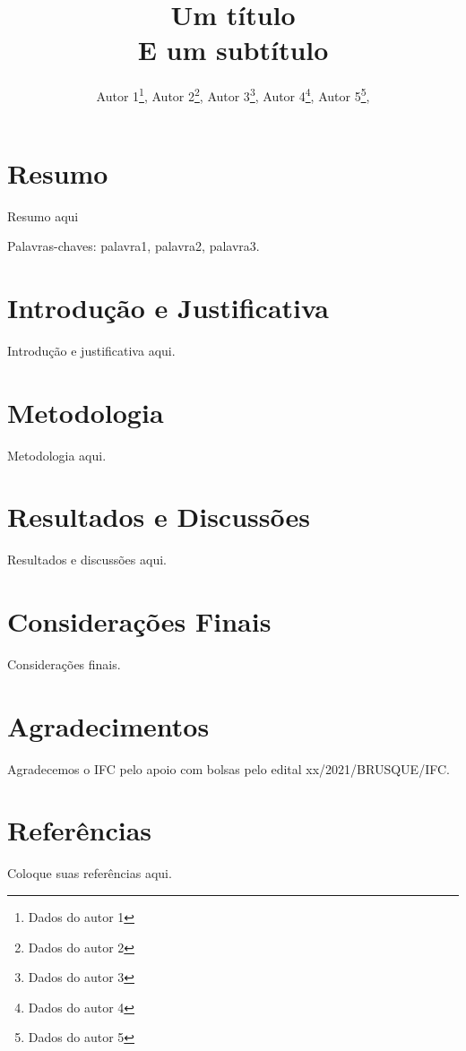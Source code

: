\documentclass[a4paper,12pt]{article}
\title{
	Um título\\
	E um subtítulo
}
\author{
	Autor 1\footnote{Dados do autor 1},
	Autor 2\footnote{Dados do autor 2},
	Autor 3\footnote{Dados do autor 3},
	Autor 4\footnote{Dados do autor 4},
	Autor 5\footnote{Dados do autor 5},
}
\begin{document}
\maketitle

\section*{\center Resumo}
Resumo aqui

Palavras-chaves: palavra1, palavra2, palavra3.

\section*{\center Introdução e Justificativa}
Introdução e justificativa aqui.

\section*{\center Metodologia}
Metodologia aqui.

\section*{\center Resultados e Discussões}
Resultados e discussões aqui.

\section*{\center Considerações Finais}
Considerações finais.

\section*{\center Agradecimentos}
Agradecemos o IFC pelo apoio com bolsas pelo edital xx/2021/BRUSQUE/IFC.

\section*{\center Referências}
Coloque suas referências aqui.
\end{document}
